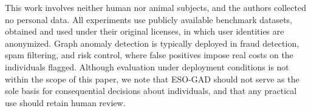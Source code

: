 This work involves neither human nor animal subjects, and the authors collected no personal data.
All experiments use publicly available benchmark datasets, obtained and used under their original licenses, in which user
identities are anonymized.
Graph anomaly detection is typically deployed in fraud detection, spam filtering, and risk control, where false positives impose real costs on the individuals flagged.
Although evaluation under deployment conditions is not within the scope of this paper, we note that ESO-GAD should not serve as the sole basis for consequential decisions about individuals, and that any practical use should retain human review.
